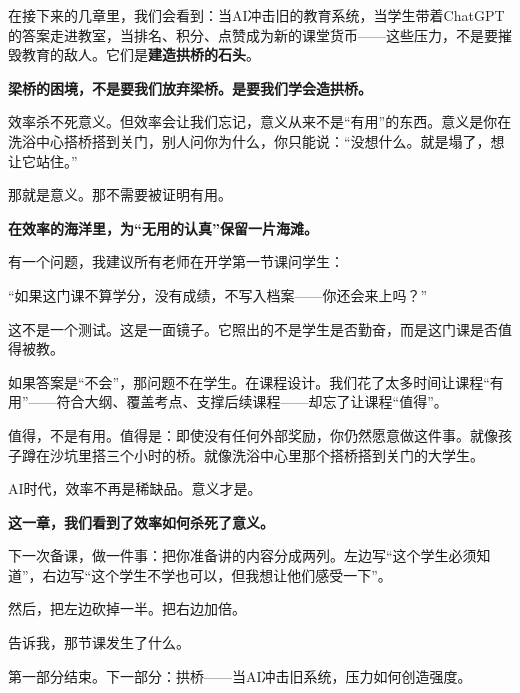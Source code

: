 在接下来的几章里，我们会看到：当AI冲击旧的教育系统，当学生带着ChatGPT的答案走进教室，当排名、积分、点赞成为新的课堂货币——这些压力，不是要摧毁教育的敌人。它们是\textbf{建造拱桥的石头}。

\begin{insight}
\label{insight:chap3}

\textbf{梁桥的困境，不是要我们放弃梁桥。是要我们学会造拱桥。}

效率杀不死意义。但效率会让我们忘记，意义从来不是``有用''的东西。意义是你在洗浴中心搭桥搭到关门，别人问你为什么，你只能说：``没想什么。就是塌了，想让它站住。''

那就是意义。那不需要被证明有用。
\end{insight}

\vspace{1cm}

\begin{shiyu-note}
\label{note:chap3}

\textbf{在效率的海洋里，为``无用的认真''保留一片海滩。}

有一个问题，我建议所有老师在开学第一节课问学生：

``如果这门课不算学分，没有成绩，不写入档案——你还会来上吗？''

这不是一个测试。这是一面镜子。它照出的不是学生是否勤奋，而是这门课是否值得被教。

如果答案是``不会''，那问题不在学生。在课程设计。我们花了太多时间让课程``有用''——符合大纲、覆盖考点、支撑后续课程——却忘了让课程``值得''。

值得，不是有用。值得是：即使没有任何外部奖励，你仍然愿意做这件事。就像孩子蹲在沙坑里搭三个小时的桥。就像洗浴中心里那个搭桥搭到关门的大学生。

AI时代，效率不再是稀缺品。意义才是。
\end{shiyu-note}

\vspace{1cm}

\begin{decision-point}
\label{decision:chap3}

\noindent\textbf{这一章，我们看到了效率如何杀死了意义。}

\vspace{0.3cm}

\noindent 下一次备课，做一件事：把你准备讲的内容分成两列。左边写``这个学生必须知道''，右边写``这个学生不学也可以，但我想让他们感受一下''。

\noindent 然后，把左边砍掉一半。把右边加倍。

\noindent 告诉我，那节课发生了什么。
\end{decision-point}

\vspace{0.5cm}

\begin{flushright}
{\small\color{muted} 第一部分结束。下一部分：拱桥——当AI冲击旧系统，压力如何创造强度。}
\end{flushright}
